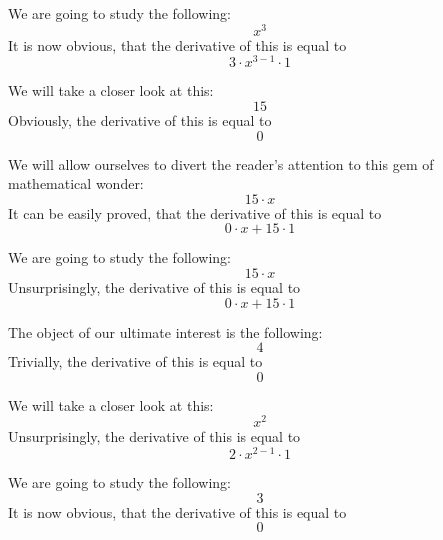 \documentclass{article}
\begin{document}
We are going to study the following:
\begin{equation}
x ^{3 } 
\end{equation}
It is now obvious, that the derivative of this is equal to
\begin{equation}
3 \cdot x ^{3 - 1 } \cdot 1 
\end{equation}

We will take a closer look at this:
\begin{equation}
15 
\end{equation}
Obviously, the derivative of this is equal to
\begin{equation}
0 
\end{equation}

We will allow ourselves to divert the reader's attention to this gem of mathematical wonder:
\begin{equation}
15 \cdot x 
\end{equation}
It can be easily proved, that the derivative of this is equal to
\begin{equation}
0 \cdot x + 15 \cdot 1 
\end{equation}

We are going to study the following:
\begin{equation}
15 \cdot x 
\end{equation}
Unsurprisingly, the derivative of this is equal to
\begin{equation}
0 \cdot x + 15 \cdot 1 
\end{equation}

The object of our ultimate interest is the following:
\begin{equation}
4 
\end{equation}
Trivially, the derivative of this is equal to
\begin{equation}
0 
\end{equation}

We will take a closer look at this:
\begin{equation}
x ^{2 } 
\end{equation}
Unsurprisingly, the derivative of this is equal to
\begin{equation}
2 \cdot x ^{2 - 1 } \cdot 1 
\end{equation}

We are going to study the following:
\begin{equation}
3 
\end{equation}
It is now obvious, that the derivative of this is equal to
\begin{equation}
0 
\end{equation}
\end{document}
